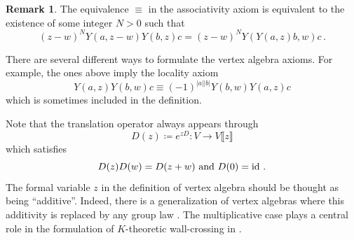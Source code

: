 \documentclass[12pt]{amsart}
\theoremstyle{definition}
\newtheorem{remark}[definition]{Remark}
\newcommand{\1}{\mathbf 1}
\DeclareMathOperator{\id}{id}
\begin{document}
\begin{remark}
The equivalence $\equiv$ in the associativity axiom is equivalent to the existence of some integer $N>0$ such that 
\[(z-w)^N Y(a, z - w)Y(b, z)c =(z-w)^N Y(Y(a, z)b, w)c\,.\]
\end{remark}

There are several different ways to formulate the vertex algebra axioms. For example, the ones above imply the locality axiom
\[Y(a, z)Y(b, w)c\equiv (-1)^{|a||b|}Y(b, w)Y(a, z)c\]
which is sometimes included in the definition.

Note that the translation operator always appears through
\[D(z)\coloneqq e^{zD}\colon V\to V\llbracket z \rrbracket\]
which satisfies
\[D(z)D(w)=D(z+w)\textup{ and }D(0)=\id\,.\]
The formal variable $z$ in the definition of vertex algebra should be thought as being ``additive''. Indeed, there is a generalization of vertex algebras where this additivity is replaced by any group law \cite{liFVA}. The multiplicative case plays a central role in the formulation of $K$-theoretic wall-crossing in \cite{Liu}. 
\end{document}
